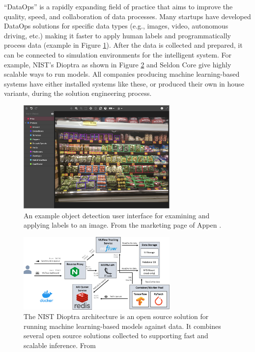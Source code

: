 ``DataOps'' is a rapidly expanding field of practice that aims to improve the quality, speed, and collaboration of data processes. Many startups have developed DataOps solutions for specific data types (e.g., images, video, autonomous driving, etc.) making it faster to apply human labels and programmatically process data (example in Figure \ref{fig:appen}). After the data is collected and prepared, it can be connected to simulation environments for the intelligent system. For example, NIST's Dioptra \cite{national_institute_of_standards_and_technology_what_2022} as shown in Figure \ref{fig:testbed} and Seldon Core \cite{seldon_core_seldon_2022,van_looveren_alibi_2022} give highly scalable ways to run models. All companies producing machine learning-based systems have either installed systems like these, or produced their own in house variants, during the solution engineering process.

\begin{figure}[ht]
    \centering
    \includegraphics[width=0.7\textwidth]{images/appen.jpg}
    \caption{An example object detection user interface for examining and applying labels to an image. From the marketing page of Appen \cite{appen_launch_2022}.}
    \label{fig:appen}
\end{figure}

\begin{figure}[ht]
    \centering
    \includegraphics[width=0.7\textwidth]{images/testbed-architecture.png}
    \caption{The NIST Dioptra architecture is an open source solution for running machine learning-based models against data. It combines several open source solutions collected to supporting fast and scalable inference. From \cite{national_institute_of_standards_and_technology_what_2022}}
    \label{fig:testbed}
\end{figure}

